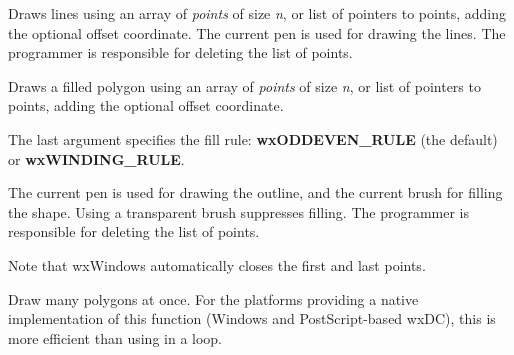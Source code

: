 Draws lines using an array of {\it points} of size {\it n}, or list of
pointers to points, adding the optional offset coordinate. The current
pen is used for drawing the lines.  The programmer is responsible for
deleting the list of points.




\label{wxdcdrawpolygon}



Draws a filled polygon using an array of {\it points} of size {\it n},
or list of pointers to points, adding the optional offset coordinate.

The last argument specifies the fill rule: {\bf wxODDEVEN\_RULE} (the
default) or {\bf wxWINDING\_RULE}.

The current pen is used for drawing the outline, and the current brush
for filling the shape.  Using a transparent brush suppresses filling.
The programmer is responsible for deleting the list of points.

Note that wxWindows automatically closes the first and last points.




\label{wxdcdrawpolypolygon}


Draw many polygons at once. For the platforms providing a native implementation
of this function (Windows and PostScript-based wxDC), this is more efficient
than using  in a loop.



